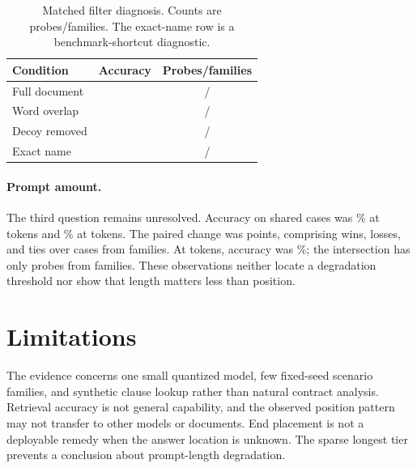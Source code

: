\documentclass{article}
\begin{document}
\begin{table}[t]
\caption{Matched filter diagnosis. Counts are probes/families. The exact-name row is a benchmark-shortcut diagnostic.}
\label{tab:diagnosis}
\centering
\small
\begin{tabular}{@{}lcc@{}}
\toprule
Condition & Accuracy & Probes/families \\
\midrule
Full document & \pruningFullAccuracy{} & \pruningFullCount{}/\pruningFullFamilyCount{} \\
Word overlap & \pruningPrunedAccuracy{} & \pruningPrunedCount{}/\pruningPrunedFamilyCount{} \\
Decoy removed & \pruningNoDecoyAccuracy{} & \pruningNoDecoyCount{}/\pruningNoDecoyFamilyCount{} \\
Exact name & \entitySelectorAccuracy{} & \entitySelectorCount{}/\entitySelectorFamilyCount{} \\
\bottomrule
\end{tabular}
\end{table}

\paragraph{Prompt amount.}
The third question remains unresolved. Accuracy on shared cases was \amountSharedTwoAccuracy{}\% at \tierTwoTokens{} tokens and \amountSharedFourAccuracy{}\% at \tierFourTokens{} tokens. The paired change was \amountSharedTwoFourChange{} points, comprising \amountSharedTwoFourWins{} wins, \amountSharedTwoFourLosses{} losses, and \amountSharedTwoFourTies{} ties over \amountSharedTwoFourDenominator{} cases from \amountSharedTwoFourFamilyCount{} families. At \tierEightTokens{} tokens, accuracy was \amountSharedEightAccuracy{}\%; the intersection has only \amountSharedEightCount{} probes from \amountSharedEightFamilyCount{} families. These observations neither locate a degradation threshold nor show that length matters less than position.

\section{Limitations}

The evidence concerns one small quantized model, few fixed-seed scenario families, and synthetic clause lookup rather than natural contract analysis. Retrieval accuracy is not general capability, and the observed position pattern may not transfer to other models or documents. End placement is not a deployable remedy when the answer location is unknown. The sparse longest tier prevents a conclusion about prompt-length degradation.
\end{document}
